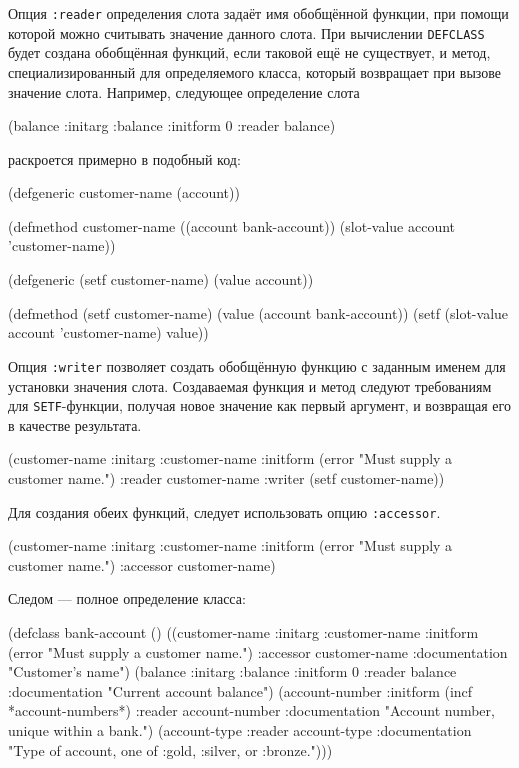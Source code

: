 Опция \lstinline{:reader} определения слота задаёт имя обобщённой функции, при помощи которой можно считывать значение данного слота. При вычислении \lstinline{DEFCLASS} будет создана обобщённая функций, если таковой ещё не существует, и метод, специализированный для определяемого класса, который возвращает при вызове значение слота. Например, следующее определение слота
\begin{cllst}{}{}
(balance
 :initarg :balance
 :initform 0
 :reader balance)
\end{cllst}
раскроется примерно в подобный код:
\begin{cllst}{}{}
(defgeneric customer-name (account))

(defmethod customer-name ((account bank-account))
  (slot-value account 'customer-name))

(defgeneric (setf customer-name) (value account))

(defmethod (setf customer-name) (value (account bank-account))
  (setf (slot-value account 'customer-name) value))
\end{cllst}

Опция \lstinline{:writer} позволяет создать обобщённую функцию с заданным именем для установки значения слота. Создаваемая функция и метод следуют требованиям для \lstinline{SETF}-функции, получая новое значение как первый аргумент, и возвращая его в качестве результата.
\begin{cllst}{}{}
(customer-name
 :initarg :customer-name
 :initform (error "Must supply a customer name.")
 :reader customer-name
 :writer (setf customer-name))
\end{cllst}

Для создания обеих функций, следует использовать опцию \lstinline{:accessor}.
\begin{cllst}{}{}
(customer-name
 :initarg :customer-name
 :initform (error "Must supply a customer name.")
 :accessor customer-name)
\end{cllst}

Следом — полное определение класса:
\begin{cllst}{}{}
(defclass bank-account ()
  ((customer-name
    :initarg :customer-name
    :initform (error "Must supply a customer name.")
    :accessor customer-name
    :documentation "Customer's name")
   (balance
    :initarg :balance
    :initform 0
    :reader balance
    :documentation "Current account balance")
   (account-number
    :initform (incf *account-numbers*)
    :reader account-number
    :documentation "Account number, unique within a bank.")
   (account-type
    :reader account-type
    :documentation "Type of account, one of :gold, :silver, or :bronze.")))
\end{cllst}

